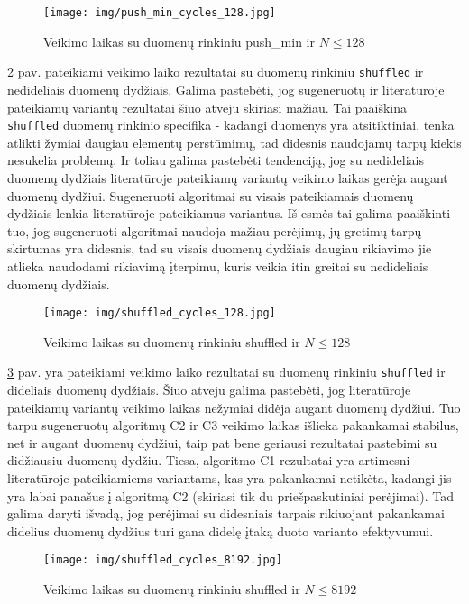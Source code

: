 \documentclass{VUMIFInfBakalaurinis}
\begin{document}
\begin{figure}[H]
  \centering
  \texttt{[image: img/push\_min\_cycles\_128.jpg]}
  \caption{Veikimo laikas su duomenų rinkiniu push\_min ir $N \leq 128$}
  \label{img:push_min_cycles_128}
\end{figure}

\ref{img:shuffled_cycles_128} pav. pateikiami veikimo laiko rezultatai su duomenų rinkiniu \verb|shuffled| ir nedideliais duomenų dydžiais.
Galima pastebėti, jog sugeneruotų ir literatūroje pateikiamų variantų rezultatai šiuo atveju skiriasi mažiau.
Tai paaiškina \verb|shuffled| duomenų rinkinio specifika - kadangi duomenys yra atsitiktiniai, tenka atlikti žymiai daugiau elementų perstūmimų,
tad didesnis naudojamų tarpų kiekis nesukelia problemų. 
Ir toliau galima pastebėti tendenciją, jog su nedideliais duomenų dydžiais literatūroje pateikiamų variantų veikimo laikas gerėja augant duomenų dydžiui.
Sugeneruoti algoritmai su visais pateikiamais duomenų dydžiais lenkia literatūroje pateikiamus variantus.
Iš esmės tai galima paaiškinti tuo, jog sugeneruoti algoritmai naudoja mažiau perėjimų, jų gretimų tarpų skirtumas yra didesnis,
tad su visais duomenų dydžiais daugiau rikiavimo jie atlieka naudodami rikiavimą įterpimu, kuris veikia
itin greitai su nedideliais duomenų dydžiais.

\begin{figure}[H]
  \centering
  \texttt{[image: img/shuffled\_cycles\_128.jpg]}
  \caption{Veikimo laikas su duomenų rinkiniu shuffled ir $N \leq 128$}
  \label{img:shuffled_cycles_128}
\end{figure}

\ref{img:shuffled_cycles_8192} pav. yra pateikiami veikimo laiko rezultatai su duomenų rinkiniu \verb|shuffled| ir dideliais duomenų dydžiais.
Šiuo atveju galima pastebėti, jog literatūroje pateikiamų variantų veikimo laikas nežymiai didėja augant duomenų dydžiui.
Tuo tarpu sugeneruotų algoritmų C2 ir C3 veikimo laikas išlieka pakankamai stabilus, net ir augant duomenų dydžiui, taip pat
bene geriausi rezultatai pastebimi su didžiausiu duomenų dydžiu.
Tiesa, algoritmo C1 rezultatai yra artimesni literatūroje pateikiamiems variantams,
kas yra pakankamai netikėta, kadangi jis yra labai panašus į algoritmą C2 (skiriasi tik du priešpaskutiniai perėjimai).
Tad galima daryti išvadą, jog perėjimai su didesniais tarpais rikiuojant pakankamai didelius duomenų dydžius turi gana didelę įtaką duoto varianto efektyvumui.

\begin{figure}[H]
  \centering
  \texttt{[image: img/shuffled\_cycles\_8192.jpg]}
  \caption{Veikimo laikas su duomenų rinkiniu shuffled ir $N \leq 8192$}
  \label{img:shuffled_cycles_8192}
\end{figure}
\end{document}
